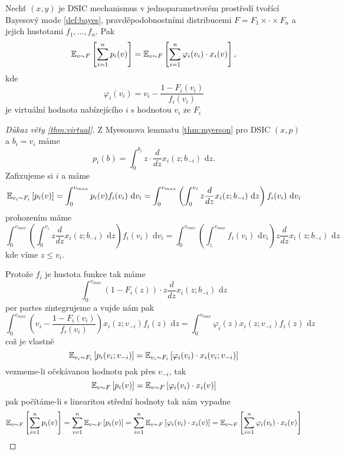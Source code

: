 \begin{theorem}\label{thm:virutal}
    Nechť $(x,y)$ je DSIC mechanismus v jednoparametrovém prostředí tvořící Bayesový mode \ref{def:bayes}, pravděpodobnostními distribucemi $F = F_1\times \cdot \times F_n$ a jejich hustotami $f_1, \dots,f_n$. 
    Pak 
    \[
        \E[v\sim F]{\sum^n_{i=1} p_i(v)} = \E[v\sim F]{\sum^n_{i=1} \varphi_i(v_i) \cdot x_i(v)},  
    \]
    kde  
    \[
        \varphi_i(v_i) = v_i - \frac{1-F_i(v_i)}{f_i(v_i)}
    \]
    je virtuální hodnota nabízejícího $i$ s hodnotou $v_i$ ze $F_i$
\end{theorem}
\begin{proof}[Důkaz věty \ref{thm:virtual}]
    Z Myesonova lemmatu \ref{thm:myerson} pro DSIC $(x,p)$ a $b_i = v_i$ máme 
    \[
        p_i(b) = \int^{b_i}_0 z \cdot \frac{d}{dz} x_i(z;b_{-i}) \text{ d}z. 
    \]
    Zafixujeme si $i$ a máme 
    \[
        \E[v_i\sim F_i]{p_i(v)} = \int^{v_{max}}_0 p_i(v)f_i(v_i) \text{ d}v_i = \int^{v_{max}}_0 \left( \int_0^{v_i} z \frac{d}{dz} x_i(z;b_{-i}) \text{ d}z \right)f_i(v_i) \text{ d}v_i
    \]
    prohozením máme 
    \[
    \int^{v_{max}}_0 \left( \int_0^{v_i} z \frac{d}{dz} x_i(z;b_{-i}) \text{ d}z \right)f_i(v_i) \text{ d}v_i = \int^{v_{max}}_0 \left( \int_z^{v_{max}} f_i(v_i) \text{ d}v_i \right) z \frac{d}{dz} x_i(z;b_{-i}) \text{ d}z
    \]
    kde víme $z \leq v_i$. 

    Protože $f_i$ je hustota funkce tak máme 
    \[
         \int^{v_{max}}_0 \left( 1- F_i(z) \right) \cdot z \frac{d}{dz} x_i(z;b_{-i}) \text{ d}z
    \]
    per partes zintegrujeme a vujde nám pak 
    \[
        \int_0^{v_{max}} \left( v_i - \frac{1-F_i(v_i)}{f_i(v_i)} \right) x_i(z;v_{-i})f_i(z) \text{ d}z = \int_0^{v_{max}} \varphi_i(z) x_i(z;v_{-i})f_i(z) \text{ d}z
    \]
    což je vlastně 
    \[
        \E[v_i \sim F_i]{p_i(v_i;v_{-i})} = \E[v_i \sim F_i]{\varphi_i(v_i) \cdot x_i(v_i;v_{-i})}
    \] 
    vezmeme-li očekávanou hodnotu pak přes $v_{-i}$, tak 
    \[
        \E[v \sim F]{p_i(v)} = \E[v \sim F]{ \varphi_i(v_i) \cdot x_i(v)}
    \]
    pak počítáme-li s linearitou střední hodnoty tak nám vypadne 
    \[
        \E[v \sim F]{\sum^n_{i=1}p_i(v)} = \sum^n_{i=1} \E[v \sim F]{p_i(v)} = \sum^n_{i=1} \E[v \sim F]{\varphi_i(v_i) \cdot x_i(v)} = \E[v \sim F]{\sum^n_{i=1} \varphi_i(v_i) \cdot x_i(v)}
    \]
\end{proof}


